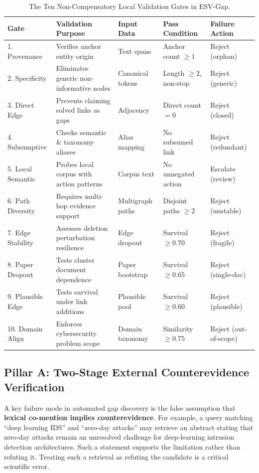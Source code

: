 \documentclass[runningheads]{llncs}
\newcommand{\method}{ESV-Gap}
\begin{document}
\begin{table}[htbp]
\centering
\caption{The Ten Non-Compensatory Local Validation Gates in \method{}.}
\label{tab:gates}
\scriptsize
\setlength{\tabcolsep}{2.5pt}
\renewcommand{\arraystretch}{0.78}
\begin{tabular}{lp{3.4cm}p{1.8cm}p{2.2cm}p{1.7cm}}
\toprule
\textbf{Gate} & \textbf{Validation Purpose} & \textbf{Input Data} & \textbf{Pass Condition} & \textbf{Failure Action} \\
\midrule
1. Provenance & Verifies anchor entity origin & Text spans & Anchor count $\ge 1$ & Reject (orphan) \\
2. Specificity & Eliminates generic non-informative nodes & Canonical tokens & Length $\ge 2$, non-stop & Reject (generic) \\
3. Direct Edge & Prevents claiming solved links as gaps & Adjacency & Direct count $= 0$ & Reject (closed) \\
4. Subsumptive & Checks semantic \& taxonomy aliases & Alias mapping & No subsumed link & Reject (redundant) \\
5. Local Semantic & Probes local corpus with action patterns & Corpus text & No unnegated action & Escalate (review) \\
6. Path Diversity & Requires multi-hop evidence support & Multigraph paths & Disjoint paths $\ge 2$ & Reject (unstable) \\
7. Edge Stability & Assesses deletion perturbation resilience & Edge dropout & Survival $\ge 0.70$ & Reject (fragile) \\
8. Paper Dropout & Tests cluster document dependence & Paper bootstrap & Survival $\ge 0.65$ & Reject (single-doc) \\
9. Plausible Edge & Tests survival under link additions & Plausible pool & Survival $\ge 0.60$ & Reject (plausible) \\
10. Domain Align & Enforces cybersecurity problem scope & Domain taxonomy & Similarity $\ge 0.75$ & Reject (out-of-scope) \\
\bottomrule
\end{tabular}
\end{table}

\subsection{Pillar A: Two-Stage External Counterevidence Verification}
\label{sec:pillar_a}

A key failure mode in automated gap discovery is the false assumption that \textbf{lexical co-mention implies counterevidence}. For example, a query matching ``deep learning IDS'' and ``zero-day attacks'' may retrieve an abstract stating that zero-day attacks remain an unresolved challenge for deep-learning intrusion detection architectures. Such a statement supports the limitation rather than refuting it. Treating such a retrieval as refuting the candidate is a critical scientific error.
\end{document}
